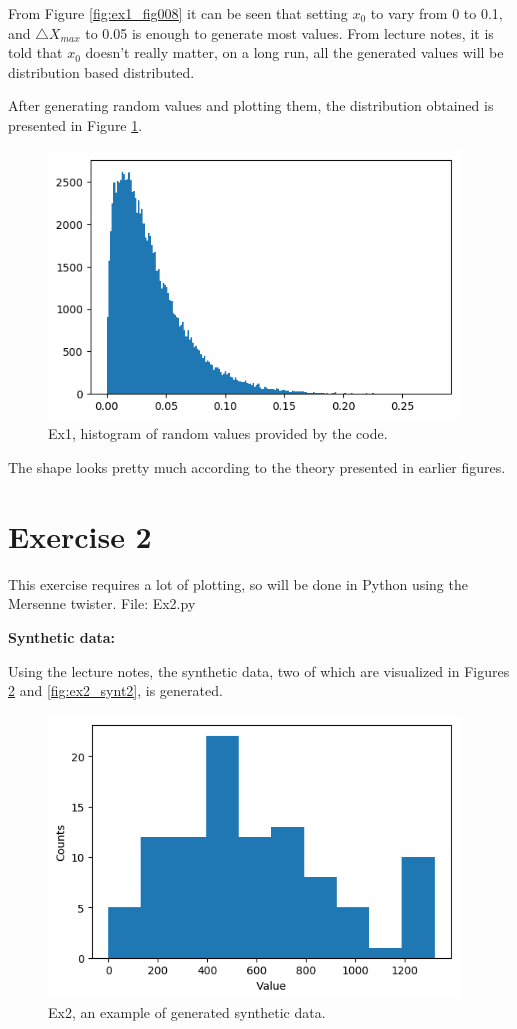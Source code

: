 \documentclass{article}
\begin{document}
From Figure \ref{fig:ex1_fig008} it can be seen that setting $x_0$ to vary from 0 to 0.1, and $\triangle X_{max}$ to 0.05 is enough to generate most values. From lecture notes, it is told that $x_0$ doesn't really matter, on a long run, all the generated values will be distribution based distributed.

After generating random values and plotting them, the distribution obtained is presented in Figure \ref{fig:ex1_myDistribution}.

\begin{figure}[!hbt]
	\centering
	\includegraphics[width=4.3in]{ex1_myDistribution}
	\caption{Ex1, histogram of random values provided by the code.}
	\label{fig:ex1_myDistribution}
\end{figure}

The shape looks pretty much according to the theory presented in earlier figures.


\clearpage

\section{Exercise 2}
This exercise requires a lot of plotting, so will be done in Python using the Mersenne twister. File: Ex2.py

\textbf{Synthetic data:}

Using the lecture notes, the synthetic data, two of which are visualized in Figures \ref{fig:ex2_synt1} and \ref{fig:ex2_synt2}, is generated.
\begin{figure}[!hbt]
	\centering
	\includegraphics[width=4.3in]{ex2_synt1}
	\caption{Ex2, an example of generated synthetic data.}
	\label{fig:ex2_synt1}
\end{figure}
\end{document}
